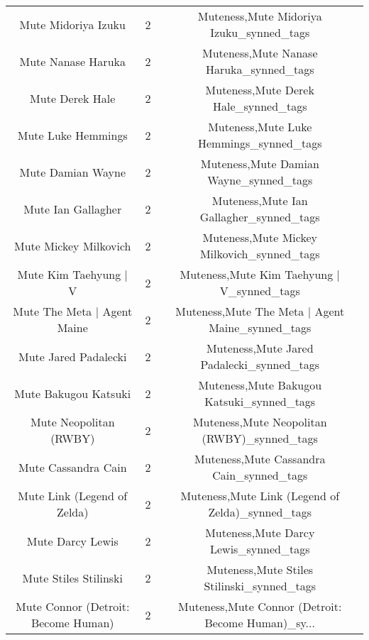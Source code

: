 \begin{table}[h!]
{\begin{tabular}{|c|c|c|}
                               Mute Midoriya Izuku &          2 &           Muteness,Mute Midoriya Izuku\_synned\_tags \\
                                Mute Nanase Haruka &          2 &            Muteness,Mute Nanase Haruka\_synned\_tags \\
                                   Mute Derek Hale &          2 &               Muteness,Mute Derek Hale\_synned\_tags \\
                                Mute Luke Hemmings &          2 &            Muteness,Mute Luke Hemmings\_synned\_tags \\
                                 Mute Damian Wayne &          2 &             Muteness,Mute Damian Wayne\_synned\_tags \\
                                Mute Ian Gallagher &          2 &            Muteness,Mute Ian Gallagher\_synned\_tags \\
                             Mute Mickey Milkovich &          2 &         Muteness,Mute Mickey Milkovich\_synned\_tags \\
                             Mute Kim Taehyung | V &          2 &         Muteness,Mute Kim Taehyung | V\_synned\_tags \\
                       Mute The Meta | Agent Maine &          2 &   Muteness,Mute The Meta | Agent Maine\_synned\_tags \\
                              Mute Jared Padalecki &          2 &          Muteness,Mute Jared Padalecki\_synned\_tags \\
                              Mute Bakugou Katsuki &          2 &          Muteness,Mute Bakugou Katsuki\_synned\_tags \\
                            Mute Neopolitan (RWBY) &          2 &        Muteness,Mute Neopolitan (RWBY)\_synned\_tags \\
                               Mute Cassandra Cain &          2 &           Muteness,Mute Cassandra Cain\_synned\_tags \\
                       Mute Link (Legend of Zelda) &          2 &   Muteness,Mute Link (Legend of Zelda)\_synned\_tags \\
                                  Mute Darcy Lewis &          2 &              Muteness,Mute Darcy Lewis\_synned\_tags \\
                             Mute Stiles Stilinski &          2 &         Muteness,Mute Stiles Stilinski\_synned\_tags \\
               Mute Connor (Detroit: Become Human) &          2 & Muteness,Mute Connor (Detroit: Become Human)\_sy... \\

\end{tabular}}
\end{table}
